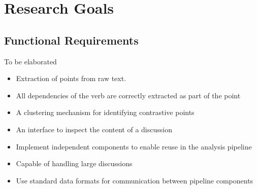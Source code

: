 \chapter{Research Goals\label{chap:requirements}}
  \section{Functional Requirements}
    To be elaborated
    \begin{itemize}
      \item{Extraction of points from raw text.}
      \item{All dependencies of the verb are correctly extracted as part of the point}
      \item{A clustering mechanism for identifying contrastive points}
      \item{An interface to inspect the content of a discussion}
      \item{Implement independent components to enable reuse in the analysis pipeline}
      \item{Capable of handling large discussions}
      \item{Use standard data formats for communication between pipeline components}
    \end{itemize}

